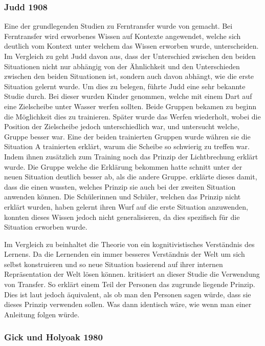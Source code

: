 \subsubsection{Judd 1908}
Eine der grundlegenden Studien zu Ferntransfer wurde von \citet{judd1908} gemacht. Bei Ferntransfer wird erworbenes Wissen auf Kontexte angewendet, welche sich deutlich vom Kontext unter welchem das Wissen erworben wurde, unterscheiden.
Im Vergleich zu \citeauthor{Woodworth1901} geht Judd davon aus, dass der Unterschied zwischen den beiden Situationen nicht nur abhängig von der Ähnlichkeit und den Unterschieden zwischen den beiden Situationen ist, sondern auch davon abhängt, wie die erste Situation gelernt wurde. Um dies zu belegen, führte Judd eine sehr bekannte Studie durch. Bei dieser wurden Kinder genommen, welche mit einem Dart auf eine Zielscheibe unter Wasser werfen sollten. Beide Gruppen bekamen zu beginn die Möglichkeit dies zu trainieren. Später wurde das Werfen wiederholt, wobei die Position der Zielscheibe jedoch unterschiedlich war, und untersucht welche, Gruppe besser war. Eine der beiden trainierten Gruppen wurde währen sie die Situation A trainierten erklärt, warum die Scheibe so schwierig zu treffen war. Indem ihnen zusätzlich zum Training noch das Prinzip der Lichtbrechung erklärt wurde. Die Gruppe welche die Erklärung bekommen hatte schnitt unter der neuen Situation deutlich besser ab, als die andere Gruppe. \citet{judd1908} erklärte dieses damit, dass die einen wussten, welches Prinzip sie auch bei der zweiten Situation anwenden können. Die Schülerinnen und Schüler, welchen das Prinzip nicht erklärt wurden, haben gelernt ihren Wurf auf die erste Situation anzuwenden, konnten dieses Wissen jedoch nicht generalisieren, da dies spezifisch für die Situation erworben wurde. 

Im Vergleich zu \citeauthor{Woodworth1901} beinhaltet die Theorie von \citeauthor{judd1908} ein kognitivistisches Verständnis des Lernens. Da die Lernenden ein immer besseres Verständnis der Welt um sich selbst konstruieren und so neue Situation basierend auf ihrer internen Repräsentation der Welt lösen können. \citet{Detterman1993} kritisiert an dieser Studie die Verwendung von Transfer. So erklärt \citeauthor{judd1908} einem Teil der Personen das zugrunde liegende Prinzip. Dies ist laut \citeauthor{Detterman1993} jedoch äquivalent, als ob man den Personen sagen würde, dass sie dieses Prinzip verwenden sollen. Was dann identisch wäre, wie wenn man einer Anleitung folgen würde.

\subsubsection{Gick und Holyoak 1980}

